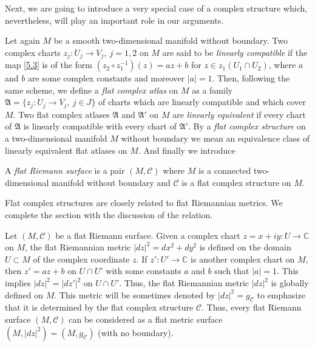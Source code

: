 \documentclass[12pt,reqno]{amsart}
\begin{document}
\medskip

Next, we are going to introduce a very special case of a complex structure which, nevertheless, will play an important role in our arguments.

Let again $M$ be a smooth two-dimensional manifold without boundary.
Two complex charts $ z_j:U_j\to V_j,\ j=1,2$ on $M$ are said to be {\it linearly compatible} if the map \eqref{5.3} is of the form
$( z_2\circ z_1^{-1})(z)=az+b$ for $z\in  z_1(U_1\cap U_2)$, where $a$ and $b$ are some complex constants and moreover $|a|=1$. Then, following the same scheme, we define a {\it flat complex atlas} on $M$ as a family $\mathfrak{A}=\{ z_j:U_j\to V_j,\ j\in J\}$ of charts which are linearly compatible and which cover $M$. Two flat complex atlases $\mathfrak{A}$ and ${\mathfrak A}'$ on $M$ are {\it linearly equivalent} if every chart of $\mathfrak{A}$ is linearly compatible with every chart of ${\mathfrak A}'$.
By a {\it flat complex structure} on a two-dimensional manifold $M$ without boundary we mean an equivalence class of linearly equivalent flat atlases on $M$. And finally we introduce

\begin{definition}
{\rm A {\it flat Riemann surface} is a pair $(M,{\mathcal C})$ where $M$ is a connected two-di\-men\-sio\-nal manifold without boundary and ${\mathcal C}$ is a flat complex structure on $M$.}
\end{definition}


Flat complex structures are closely related to flat Riemannian metrics. We complete the section with the discussion of the relation.

Let $(M,{\mathcal C})$ be a flat Riemann surface. Given a complex chart $z=x+iy:U\to{\mathbb C}$ on $M$, the flat Riemannian metric $|dz|^2=dx^2+dy^2$ is defined on the domain $U\subset M$ of the complex coordinate $z$. If $z':U'\to{\mathbb C}$ is another complex chart on $M$, then $z'=az+b$ on $U\cap U'$ with some constants $a$ and $b$ such that $|a|=1$. This implies $|dz|^2=|dz'|^2$ on $U\cap U'$. Thus, the flat Riemannian metric $|dz|^2$ is globally defined on $M$. This metric  will be sometimes denoted by $|dz|^2=g_{\mathcal C}$ to emphasize that it is determined by the flat complex structure ${\mathcal C}$. Thus, every flat Riemann surface $(M,{\mathcal C})$ can be considered as a flat metric surface $(M,|dz|^2)=(M,g_{\mathcal C})$ (with no boundary).
\end{document}
